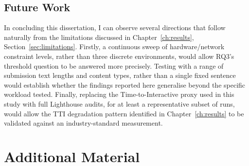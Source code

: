 \documentclass[11pt,a4paper]{report}
\begin{document}
\section{Future Work}

In concluding this dissertation, I can observe several directions that follow naturally from the limitations discussed in Chapter~\ref{ch:results}, Section~\ref{sec:limitations}. Firstly, a continuous sweep of hardware/network constraint levels, rather than three discrete environments, would allow RQ3's threshold question to be answered more precisely. Testing with a range of submission text lengths and content types, rather than a single fixed sentence would establish whether the findings reported here generalise beyond the specific workload tested. Finally, replacing the Time-to-Interactive proxy used in this study with full Lighthouse audits, for at least a representative subset of runs, would allow the TTI degradation pattern identified in Chapter~\ref{ch:results} to be validated against an industry-standard measurement.

\printbibliography

\appendix
\chapter{Additional Material}
\end{document}

